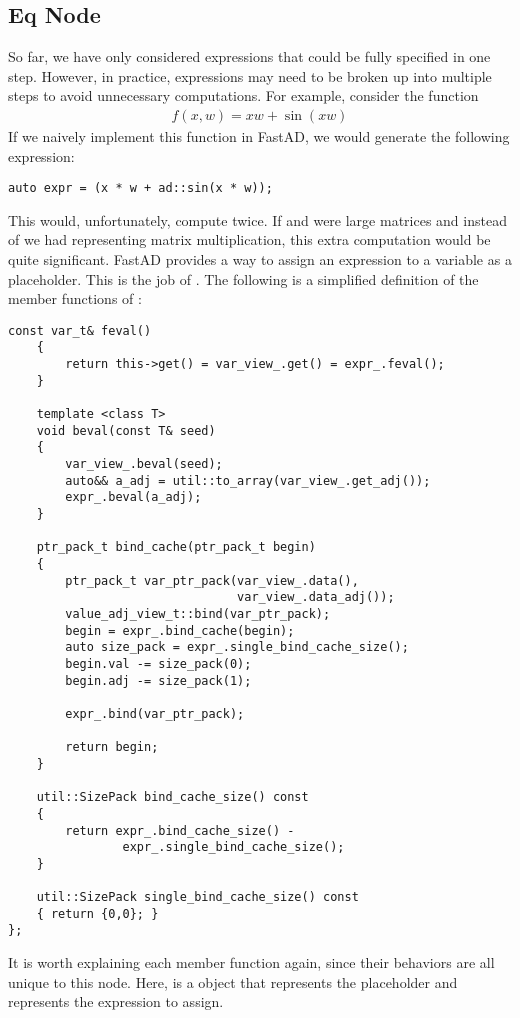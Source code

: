 \subsection{Eq Node}\label{ssec:eq}

So far, we have only considered expressions that could be fully specified in one step.
However, in practice, expressions may need to be broken up into multiple steps
to avoid unnecessary computations.
For example, consider the function
\begin{align}
    f(x,w) = xw + \sin(xw) \label{eq:eq-example}
\end{align}
If we naively implement this function in FastAD, 
we would generate the following expression:
\begin{lstlisting}[style=customcpp]
    auto expr = (x * w + ad::sin(x * w));
\end{lstlisting}
This would, unfortunately, compute  twice.
If  and  were large matrices and instead of 
we had  representing matrix multiplication,
this extra computation would be quite significant.
FastAD provides a way to assign an expression to a variable as a placeholder.
This is the job of .
The following is a simplified definition of the member functions of :
\begin{lstlisting}[style=customcpp]
    const var_t& feval()
    {
        return this->get() = var_view_.get() = expr_.feval();
    }

    template <class T>
    void beval(const T& seed)
    {
        var_view_.beval(seed);
        auto&& a_adj = util::to_array(var_view_.get_adj());
        expr_.beval(a_adj);
    }

    ptr_pack_t bind_cache(ptr_pack_t begin)
    {
        ptr_pack_t var_ptr_pack(var_view_.data(), 
                                var_view_.data_adj());
        value_adj_view_t::bind(var_ptr_pack);
        begin = expr_.bind_cache(begin);
        auto size_pack = expr_.single_bind_cache_size();
        begin.val -= size_pack(0);
        begin.adj -= size_pack(1);

        expr_.bind(var_ptr_pack);

        return begin;
    }

    util::SizePack bind_cache_size() const 
    { 
        return expr_.bind_cache_size() - 
                expr_.single_bind_cache_size();
    }

    util::SizePack single_bind_cache_size() const 
    { return {0,0}; }
};
\end{lstlisting}
It is worth explaining each member function again, 
since their behaviors are all unique to this node.
Here,  is a  object that represents the placeholder
and  represents the expression to assign.

